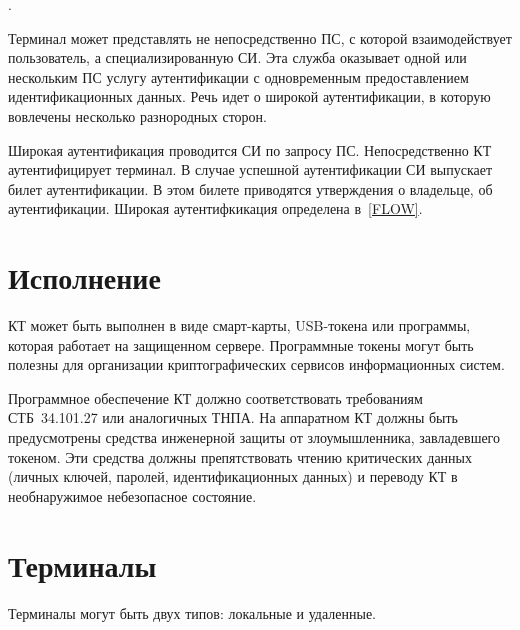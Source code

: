 
.

Терминал может представлять не непосредственно ПС, с которой взаимодействует 
пользователь, а специализированную СИ. Эта служба оказывает одной или 
нескольким ПС услугу аутентификации с одновременным предоставлением 
идентификационных данных. Речь идет о широкой аутентификации, в которую вовлечены
несколько разнородных сторон.  

Широкая аутентификация проводится СИ по запросу ПС.
Непосредственно КТ аутентифицирует терминал.
В случае успешной аутентификации СИ выпускает билет 
аутентификации. В этом билете приводятся утверждения о владельце, об 
аутентификации. Широкая аутентифкикация определена в~\ref{FLOW}.

\section{Исполнение} 

КТ может быть выполнен в виде смарт-карты, USB-токена 
или программы, которая работает на защищенном сервере. 
Программные токены могут быть полезны для организации криптографических 
сервисов информационных систем. 


Программное обеспечение КТ должно соответствовать требованиям СТБ~34.101.27  или
аналогичных ТНПА. На аппаратном КТ должны быть предусмотрены средства инженерной
защиты от злоумышленника, завладевшего токеном. Эти средства должны
препятствовать чтению критических данных (личных ключей, паролей,
идентификационных данных) и переводу КТ в необнаружимое небезопасное состояние.

\section{Терминалы}

Терминалы могут быть двух типов: локальные и удаленные.

